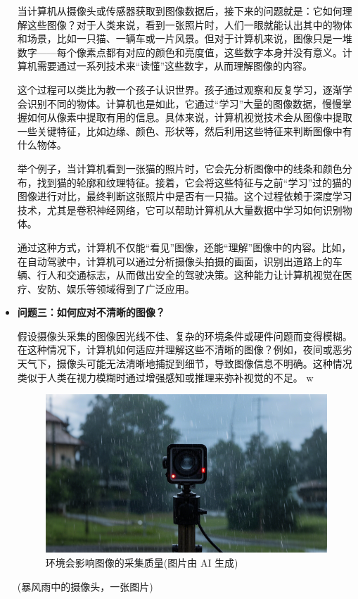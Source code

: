 \begin{itemize}
当计算机从摄像头或传感器获取到图像数据后，接下来的问题就是：它如何理解这些图像？对于人类来说，看到一张照片时，人们一眼就能认出其中的物体和场景，比如一只猫、一辆车或一片风景。但对于计算机来说，图像只是一堆数字——每个像素点都有对应的颜色和亮度值，这些数字本身并没有意义。计算机需要通过一系列技术来“读懂”这些数字，从而理解图像的内容。

这个过程可以类比为教一个孩子认识世界。孩子通过观察和反复学习，逐渐学会识别不同的物体。计算机也是如此，它通过“学习”大量的图像数据，慢慢掌握如何从像素中提取有用的信息。具体来说，计算机视觉技术会从图像中提取一些关键特征，比如边缘、颜色、形状等，然后利用这些特征来判断图像中有什么物体。

举个例子，当计算机看到一张猫的照片时，它会先分析图像中的线条和颜色分布，找到猫的轮廓和纹理特征。接着，它会将这些特征与之前“学习”过的猫的图像进行对比，最终判断这张照片中是否有一只猫。这个过程依赖于深度学习技术，尤其是卷积神经网络，它可以帮助计算机从大量数据中学习如何识别物体。

通过这种方式，计算机不仅能“看见”图像，还能“理解”图像中的内容。比如，在自动驾驶中，计算机可以通过分析摄像头拍摄的画面，识别出道路上的车辆、行人和交通标志，从而做出安全的驾驶决策。这种能力让计算机视觉在医疗、安防、娱乐等领域得到了广泛应用。

\item \textbf{问题三：如何应对不清晰的图像？}  

    假设摄像头采集的图像因光线不佳、复杂的环境条件或硬件问题而变得模糊。在这种情况下，计算机如何适应并理解这些不清晰的图像？例如，夜间或恶劣天气下，摄像头可能无法清晰地捕捉到细节，导致图像信息不明确。这种情况类似于人类在视力模糊时通过增强感知或推理来弥补视觉的不足。
w\begin{figure}[htb]
	\centering
	\includegraphics[width=\linewidth]{image/4/暴雨摄像头.png}
	\caption{环境会影响图像的采集质量(图片由 AI 生成)}
\end{figure}
(暴风雨中的摄像头，一张图片)


\end{itemize}
